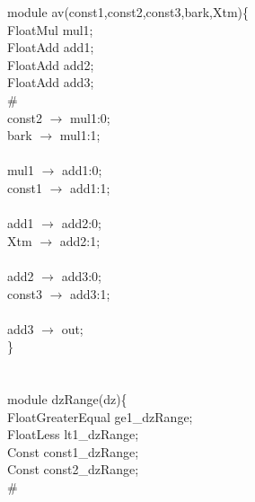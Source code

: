 \noindent module av(const1,const2,const3,bark,Xtm)\{ \\
\hspace*{2em}FloatMul mul1; \\
\hspace*{2em}FloatAdd add1; \\
\hspace*{2em}FloatAdd add2; \\
\hspace*{2em}FloatAdd add3; \\
\# \\
\hspace*{2em}const2 $\rightarrow$ mul1:0; \\
\hspace*{2em}bark $\rightarrow$ mul1:1; \\
   \\
   \hspace*{2em}mul1 $\rightarrow$ add1:0; \\
   \hspace*{2em}const1 $\rightarrow$ add1:1; \\
   \\
   \hspace*{2em}add1 $\rightarrow$ add2:0; \\
   \hspace*{2em}Xtm $\rightarrow$ add2:1; \\
   \\
   \hspace*{2em}add2 $\rightarrow$ add3:0; \\
   \hspace*{2em}const3 $\rightarrow$ add3:1; \\
   \\
   \hspace*{2em}add3 $\rightarrow$ out; \\
\} \\
\\
\\
module dzRange(dz)\{ \\
\hspace*{2em}FloatGreaterEqual ge1\_dzRange; \\
\hspace*{2em}FloatLess lt1\_dzRange; \\
\hspace*{2em}Const const1\_dzRange; \\
\hspace*{2em}Const const2\_dzRange; \\
\# \\
